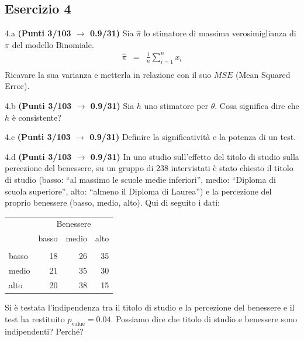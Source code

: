 \documentclass[
  11pt,
]{book}
\theoremstyle{mytheoremstyle}
\theoremstyle{mydefstyle}
\begin{document}
\subsection{Esercizio 4}\label{esercizio-4-22}

4.a \textbf{(Punti 3/103 \(\rightarrow\) 0.9/31)} Sia \(\hat \pi\) lo stimatore di massima verosimiglianza di \(\pi\) del modello Binomiale.
\begin{eqnarray*}
  \hat\pi &=&  \frac 1n\sum_{i=1}^nx_i\\
\end{eqnarray*}
Ricavare la sua varianza e metterla in relazione con il suo \(MSE\) (Mean Squared Error).

4.b \textbf{(Punti 3/103 \(\rightarrow\) 0.9/31)} Sia \(h\) uno stimatore per \(\theta\). Cosa significa dire che \(h\) è consistente?

4.c \textbf{(Punti 3/103 \(\rightarrow\) 0.9/31)} Definire la significatività e la potenza di un test.

4.d \textbf{(Punti 3/103 \(\rightarrow\) 0.9/31)} In uno studio sull'effetto del titolo di studio sulla percezione del benessere, su un gruppo di 238 intervistati è stato chiesto il titolo di studio (basso: ``al massimo le scuole medie inferiori'', medio: ``Diploma di scuola superiore'', alto: ``almeno il Diploma di Laurea'') e la percezione del proprio benessere (basso, medio, alto). Qui di seguito i dati:

\begin{table}[H]
\centering\centering
\begin{tabular}{lrrr}
\toprule
\multicolumn{1}{c}{ } & \multicolumn{3}{c}{Benessere} \\
\cmidrule(l{3pt}r{3pt}){2-4}
  & basso & medio & alto\\
\midrule
\addlinespace[0.3em]
\multicolumn{4}{l}{\textbf{Titolo di studio}}\\
\hspace{1em}basso & 18 & 26 & 35\\
\hspace{1em}medio & 21 & 35 & 30\\
\hspace{1em}alto & 20 & 38 & 15\\
\bottomrule
\end{tabular}
\end{table}

Si è testata l'indipendenza tra il titolo di studio e la percezione del benessere e il test ha restituito \(p_\text{value}=0.04\). Possiamo dire che titolo di studio e benessere sono indipendenti? Perché?
\end{document}
